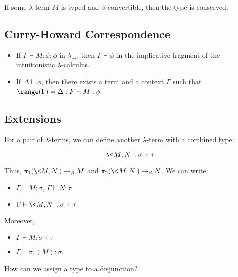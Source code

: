 \documentclass[11pt]{scrartcl}
\begin{document}
  If some $\lambda$-term $M$ is typed and $\beta$-convertible, then
  the type is conserved.

  \subsection{Curry-Howard Correspondence}

  \begin{theorem}
    \hfill
    \begin{itemize}
    \item If $\Gamma\vdash M:\phi:\phi$ in $\lambda_{\to}$, then
      $\Gamma\vdash \phi$ in the implicative fragment of the
      intuitionistic $\lambda$-calculus.
    \item If $\Delta \vdash \phi$, then there exists a term and a
      context $\Gamma$ such that
      $\range(\Gamma) = \Delta:F\vdash M:\phi$.
    
    \end{itemize}
  \end{theorem}

  \subsection{Extensions}

  For a pair of $\lambda$-terms, we can define another $\lambda$-term
  with a combined type:

  \begin{equation*}
    \< M, N \> : \sigma \times \tau
  \end{equation*}

  Thus, $\pi_{1}(\< M, N \>) \to_{\beta} M$ and
  $\pi_{2}(\<M, N\>) \to_{\beta} N$. We can write:

  \begin{itemize}
  \item $\Gamma \vdash M:\sigma$, $\Gamma \vdash N:\tau$
  \item $\Gamma \vdash \<M, N \>: \sigma \times \tau$
  \end{itemize}

  Moreover,

  \begin{itemize}
  \item $\Gamma \vdash M: \sigma \times \tau$
  \item $\Gamma \vdash \pi_{1}(M):\sigma$.
  \end{itemize}

  How can we assign a type to a disjunction?
\end{document}
